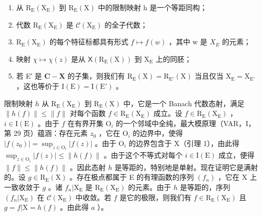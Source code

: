 \begin{enumerate}
\def\labelenumi{\alph{enumi})}
\item
  从 \(\mathrm{R}_{\mathrm{E}}(\mathrm{X}_{\mathrm{E}})\) 到 \(\mathrm{R}_{\mathrm{E}}(\mathrm{X})\) 中的限制映射 h 是一个等距同构；
\item
  代数 \(\mathrm{R}_{\mathrm{E}}(\mathrm{X}_{\mathrm{E}})\) 是 \(\mathcal{C}(\mathrm{X}_{\mathrm{E}})\) 的全子代数；
\item
  \(\mathrm{R}_{\mathrm{E}}(\mathrm{X}_{\mathrm{E}})\) 的每个特征标都具有形式 \(f \mapsto f(w)\) ，其中 w 是 \(X_{E}\) 的元素；
\item
  映射 \(\chi \mapsto \chi (z)\) 是从 \(\mathsf{X}(\mathrm{R}_{\mathrm{E}}(\mathrm{X}))\) 到 \(\mathrm{X}_{\mathrm{E}}\) 上的同胚；
\item
  若 E′ 是 \(\mathbf{C} - \mathbf{X}\) 的子集，则我们有 \(\mathrm{R}_{\mathrm{E}}(\mathrm{X}) = \mathrm{R}_{\mathrm{E}'}(\mathrm{X})\) 当且仅当 \(\mathrm{X}_{\mathrm{E}} = \mathrm{X}_{\mathrm{E}'}\) ，这也等价于 \(\mathrm{I}(\mathrm{E}) = \mathrm{I}(\mathrm{E}')\) 。
\end{enumerate}

限制映射 \(h\) 从 \(\mathrm{R}_{\mathrm{E}}(\mathrm{X}_{\mathrm{E}})\) 到 \(\mathrm{R}_{\mathrm{E}}(\mathrm{X})\) 中，它是一个 Banach 代数态射，满足 \(\| h(f)\| \leqslant \| f\|\) 对每个函数 \(f\in \mathrm{R}_{\mathrm{E}}(\mathrm{X}_{\mathrm{E}})\) 成立。设 \(f\in \mathrm{R}_{\mathrm{E}}(\mathrm{X}_{\mathrm{E}})\) ，\(i\in \mathrm{I}(\mathrm{E})\) 。由于 \(f\) 在有界开集 \(\mathrm{O}_i\) 的一个邻域中全纯，最大模原理（VAR，I，第 29 页）蕴涵：存在元素 \(z_0\) ，它在 \(\mathrm{O}_i\) 的边界中，使得 \(|f(z_0)| = \sup_{z\in \mathrm{O}_i}|f(z)|\) 。由于 \(\mathrm{O}_i\) 的边界包含于 X（引理 1），由此得 \(\sup_{z\in \mathrm{O}_i}|f(z)|\leqslant \| h(f)\|\) 。由于这个不等式对每个 \(i\in \mathrm{I}(\mathrm{E})\) 成立，便得 \(\| f\| \leqslant \| h(f)\|\) 。因此态射 \(h\) 是等距的，特别地是单射。现在证明它是满射的。设 \(g\in \mathrm{R}_{\mathrm{E}}(\mathrm{X})\) 。存在极点都属于 E 的有理函数的序列 \((f_n)\) ，它在 X 上一致收敛于 \(g\) 。诸 \(f_n|\mathrm{X}_{\mathrm{E}}\) 是 \(\mathrm{R}_{\mathrm{E}}(\mathrm{X}_{\mathrm{E}})\) 的元素。由于 \(h\) 是等距的，序列 \((f_n|\mathrm{X}_{\mathrm{E}})\) 在 \(\mathcal{C}(\mathrm{X}_{\mathrm{E}})\) 中收敛。若 \(f\) 是它的极限，则我们有 \(f\in \mathrm{R}_{\mathrm{E}}(\mathrm{X}_{\mathrm{E}})\) 且 \(g = f|\mathrm{X} = h(f)\) 。由此得 \(a\) ）。

